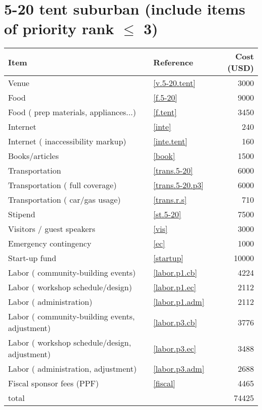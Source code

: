 \section*{5-20 tent suburban (include items of priority rank $\leq$ 3)}
\begin{center}
\begin{tabular}{llr}
Item & Reference & Cost (USD) \\ \hline
Venue & \ref{v.5-20.tent} & 3000 \\
Food & \ref{f.5-20} & 9000 \\
Food ( prep materials, appliances...) & \ref{f.tent} & 3450 \\
Internet & \ref{inte} & 240 \\
Internet ( inaccessibility markup) & \ref{inte.tent} & 160 \\
Books/articles & \ref{book} & 1500 \\
Transportation & \ref{trans.5-20} & 6000 \\
Transportation ( full coverage) & \ref{trans.5-20.p3} & 6000 \\
Transportation ( car/gas usage) & \ref{trans.r.s} & 710 \\
Stipend & \ref{st.5-20} & 7500 \\
Visitors / guest speakers & \ref{vis} & 3000 \\
Emergency contingency & \ref{ec} & 1000 \\
Start-up fund & \ref{startup} & 10000 \\
Labor ( community-building events) & \ref{labor.p1.cb} & 4224 \\
Labor ( workshop schedule/design) & \ref{labor.p1.ec} & 2112 \\
Labor ( administration) & \ref{labor.p1.adm} & 2112 \\
Labor ( community-building events, adjustment) & \ref{labor.p3.cb} & 3776 \\
Labor ( workshop schedule/design, adjustment) & \ref{labor.p3.ec} & 3488 \\
Labor ( administration, adjustment) & \ref{labor.p3.adm} & 2688 \\
Fiscal sponsor fees (PPF) & \ref{fiscal} & 4465 \\ \hline
total &  & 74425
\end{tabular}
\end{center}
\newpage
